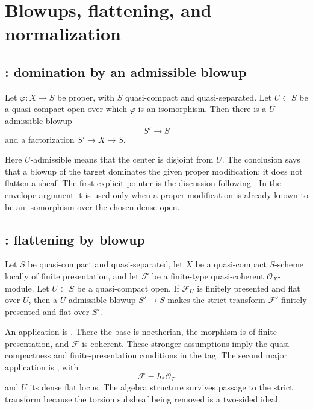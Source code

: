 \section{Blowups, flattening, and normalization}
\label{sec:stacks-flattening}

\subsection*{: domination by an admissible blowup}
\label{sec:stacks-tag-081T}

Let \(\varphi:X\to S\) be proper, with \(S\) quasi-compact and
quasi-separated. Let \(U\subset S\) be a quasi-compact open over which
\(\varphi\) is an isomorphism. Then there is a \(U\)-admissible blowup
\[
                         S'\longrightarrow S
\]
and a factorization \(S'\to X\to S\).

Here \(U\)-admissible means that the center is disjoint from \(U\).
The conclusion says that a blowup of the target dominates the given proper
modification; it does not flatten a sheaf. The first explicit pointer is
the discussion following . In the
envelope argument it is used only when a proper modification is already
known to be an isomorphism over the chosen dense open.

\subsection*{: flattening by blowup}
\label{sec:stacks-tag-0815}

Let \(S\) be quasi-compact and quasi-separated, let \(X\) be a
quasi-compact \(S\)-scheme locally of finite presentation, and let
\(\mathcal F\) be a finite-type quasi-coherent \(\mathcal O_X\)-module.
Let \(U\subset S\) be a quasi-compact open. If \(\mathcal F_U\) is finitely
presented and flat over \(U\), then a \(U\)-admissible blowup
\(S'\to S\) makes the strict transform \(\mathcal F'\) finitely presented
and flat over \(S'\).

An application is . There the
base is noetherian, the morphism is of finite presentation, and
\(\mathcal F\) is coherent. These stronger assumptions imply the
quasi-compactness and finite-presentation conditions in the tag. The
second major application is , with
\[
                         \mathcal F=h_*\mathcal O_T
\]
and \(U\) its dense flat locus. The algebra structure survives passage to
the strict transform because the torsion subsheaf being removed is a
two-sided ideal.

